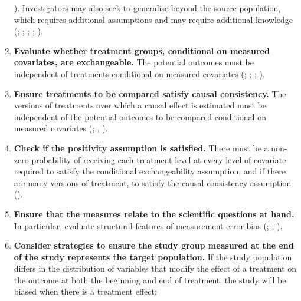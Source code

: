 \documentclass[
  single column]{article}
\begin{document}
\begin{enumerate}
  ).
  Investigators may also seek to generalise beyond the source
  population, which requires additional assumptions and may require
  additional knowledge (; ; ;
  ;
  ).
\item
  \textbf{Evaluate whether treatment groups, conditional on measured
  covariates, are exchangeable.} The potential outcomes must be
  independent of treatments conditional on measured covariates
  (;
  ;
  ;
  ).
\item
  \textbf{Ensure treatments to be compared satisfy causal consistency.}
  The versions of treatments over which a causal effect is estimated
  must be independent of the potential outcomes to be compared
  conditional on measured covariates
  (;
  ,
  ).
\item
  \textbf{Check if the positivity assumption is satisfied.} There must
  be a non-zero probability of receiving each treatment level at every
  level of covariate required to satisfy the conditional exchangeability
  assumption, and if there are many versions of treatment, to satisfy
  the causal consistency assumption
  ().
\item
  \textbf{Ensure that the measures relate to the scientific questions at
  hand.} In particular, evaluate structural features of measurement
  error bias (;
  ;
  ).
\item
  \textbf{Consider strategies to ensure the study group measured at the
  end of the study represents the target population.} If the study
  population differs in the distribution of variables that modify the
  effect of a treatment on the outcome at both the beginning and end of
  treatment, the study will be biased when there is a treatment effect;

\end{enumerate}
\end{document}
